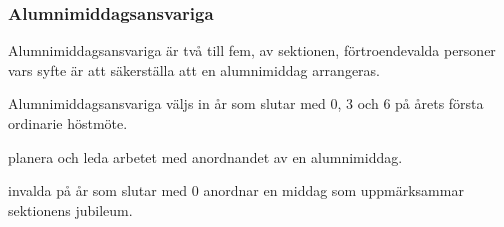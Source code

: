 \subsubsection{Alumnimiddagsansvariga}
Alumnimiddagsansvariga är två till fem, av sektionen, förtroendevalda personer vars syfte är att säkerställa att en alumnimiddag arrangeras.

Alumnimiddagsansvariga väljs in år som slutar med 0, 3 och 6 på årets första ordinarie höstmöte.

\begin{att}
  \item planera och leda arbetet med anordnandet av en alumnimiddag.
  \item invalda på år som slutar med 0 anordnar en middag som uppmärksammar sektionens jubileum.
\end{att}